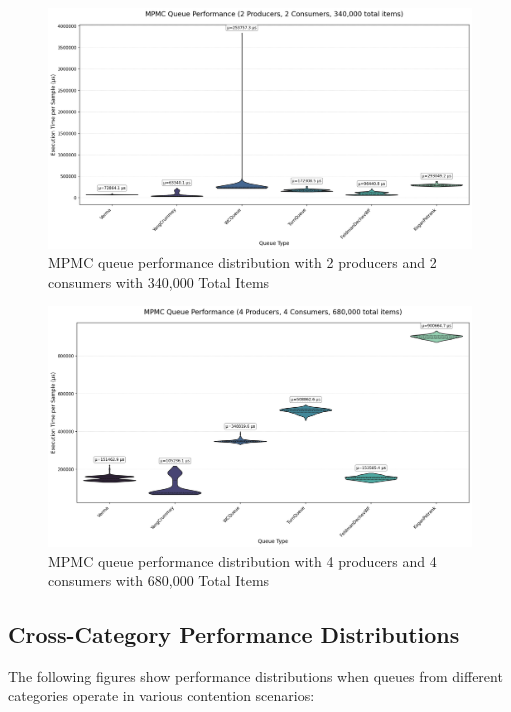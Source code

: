 \begin{figure}[H]
\centering
\caption{MPMC queue performance distribution with 2 producers and 2 consumers with 340,000 Total Items}
\label{fig:mpmc-violin-2p2c}
\includegraphics[width=\textwidth]{images/results/mpmc_performance_violin_2P_2C.png}
\end{figure}

\begin{figure}[H]
\centering
\caption{MPMC queue performance distribution with 4 producers and 4 consumers with 680,000 Total Items}
\label{fig:mpmc-violin-4p4c}
\includegraphics[width=\textwidth]{images/results/mpmc_performance_violin_4P_4C.png}
\end{figure}

\subsection{Cross-Category Performance Distributions}
The following figures show performance distributions when queues from different categories operate in various contention scenarios:

